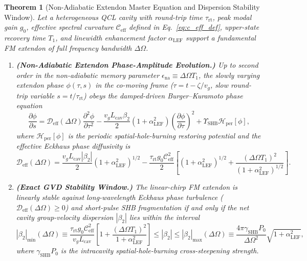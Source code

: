 \documentclass[11pt,letterpaper]{article}
\newtheorem{theorem}{Theorem}
\begin{document}
\begin{theorem}[Non-Adiabatic Extendon Master Equation and Dispersion Stability Window]
\label{thm:non_adiabatic}
Let a heterogeneous QCL cavity with round-trip time $\tau_{\mathrm{rt}}$, peak modal gain $g_0$, effective spectral curvature $\mathcal{C}_{\mathrm{eff}}$ defined in Eq.~\eqref{eq:c_eff_def}, upper-state recovery time $T_1$, and linewidth enhancement factor $\alpha_{\mathrm{LEF}}$ support a fundamental FM extendon of full frequency bandwidth $\Delta\Omega$.
\begin{enumerate}
    \item[(a)] \textbf{(Non-Adiabatic Extendon Phase-Amplitude Evolution.)} Up to second order in the non-adiabatic memory parameter $\epsilon_{\mathrm{na}} \equiv \Delta\Omega T_1$, the slowly varying extendon phase $\phi(\tau, s)$ in the co-moving frame ($\tau = t - \zeta/v_g$, slow round-trip variable $s = t/\tau_{\mathrm{rt}}$) obeys the damped-driven Burger--Kuramoto phase equation
    \begin{equation}
    \frac{\partial \phi}{\partial s} = \mathcal{D}_{\mathrm{eff}}(\Delta\Omega)\frac{\partial^2 \phi}{\partial \tau^2} - \frac{v_g L_{\mathrm{cav}}\beta_2}{2}\left(1 + \alpha_{\mathrm{LEF}}^2\right)\left(\frac{\partial \phi}{\partial \tau}\right)^2 + \Upsilon_{\mathrm{SHB}}\mathcal{H}_{\mathrm{per}}[\phi],
    \label{eq:thm1_phase_eq}
    \end{equation}
    where $\mathcal{H}_{\mathrm{per}}[\phi]$ is the periodic spatial-hole-burning restoring potential and the effective Eckhaus phase diffusivity is
    \begin{equation}
    \mathcal{D}_{\mathrm{eff}}(\Delta\Omega) = \frac{v_g L_{\mathrm{cav}}|\beta_2|}{2}\left(1 + \alpha_{\mathrm{LEF}}^2\right)^{1/2} - \frac{\tau_{\mathrm{rt}} g_0 \mathcal{C}_{\mathrm{eff}}^2}{2}\left[ (1 + \alpha_{\mathrm{LEF}}^2)^{1/2} + \frac{(\Delta\Omega T_1)^2}{(1 + \alpha_{\mathrm{LEF}}^2)^{1/2}} \right].
    \label{eq:thm1_diffusivity}
    \end{equation}
    \item[(b)] \textbf{(Exact GVD Stability Window.)} The linear-chirp FM extendon is linearly stable against long-wavelength Eckhaus phase turbulence ($\mathcal{D}_{\mathrm{eff}}(\Delta\Omega) \ge 0$) and short-pulse SHB fragmentation if and only if the net cavity group-velocity dispersion $|\beta_2|$ lies within the interval
    \begin{equation}
    |\beta_2|_{\min}(\Delta\Omega) \equiv \frac{\tau_{\mathrm{rt}} g_0 \mathcal{C}_{\mathrm{eff}}^2}{v_g L_{\mathrm{cav}}}\left[ 1 + \frac{(\Delta\Omega T_1)^2}{1 + \alpha_{\mathrm{LEF}}^2} \right] \le |\beta_2| \le |\beta_2|_{\max}(\Delta\Omega) \equiv \frac{4\pi \gamma_{\mathrm{SHB}} P_0}{\Delta\Omega^2}\sqrt{1 + \alpha_{\mathrm{LEF}}^2},
    \label{eq:thm1_gvd_window}
    \end{equation}
    where $\gamma_{\mathrm{SHB}} P_0$ is the intracavity spatial-hole-burning cross-steepening strength.
\end{enumerate}
\end{theorem}
\end{document}
